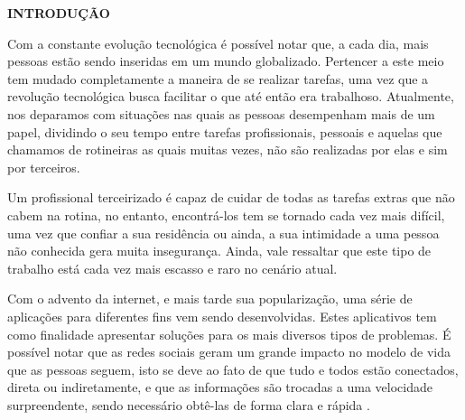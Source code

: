 \begin{flushleft}
	\vspace{1.2em}
	\textbf{\large INTRODUÇÃO}
	\vspace{2.9em}
\end{flushleft}
\thispagestyle{empty}


\par Com a constante evolução tecnológica é possível notar que, a cada dia, mais pessoas estão sendo inseridas em um mundo globalizado. Pertencer a este meio tem mudado completamente a maneira de se realizar tarefas, uma vez que a revolução tecnológica busca facilitar o que até então era trabalhoso. Atualmente, nos deparamos com situações nas quais as pessoas desempenham mais de um papel, dividindo o seu tempo entre tarefas profissionais, pessoais e aquelas que chamamos de rotineiras as quais muitas vezes, não são realizadas por elas e sim por terceiros.

\par Um profissional terceirizado é capaz de cuidar de todas as tarefas extras que não cabem na rotina, no entanto, encontrá-los tem se tornado cada vez mais difícil, uma vez que confiar a sua residência ou ainda, a sua intimidade a uma pessoa não conhecida gera muita insegurança. Ainda, vale ressaltar que este tipo de trabalho está cada vez mais escasso e raro no cenário atual.

\par Com o advento da internet, e mais tarde sua popularização, uma série de aplicações para diferentes fins vem sendo desenvolvidas. Estes aplicativos tem como finalidade apresentar soluções para os mais diversos tipos de problemas. É possível notar que as redes sociais geram um grande impacto no modelo de vida que as pessoas seguem, isto se deve ao fato de que tudo e todos estão conectados, direta ou indiretamente, e que as informações são trocadas a uma velocidade surpreendente, sendo necessário obtê-las de forma clara e rápida \cite{barbosa_why_people_use_social_network}.

\par%


